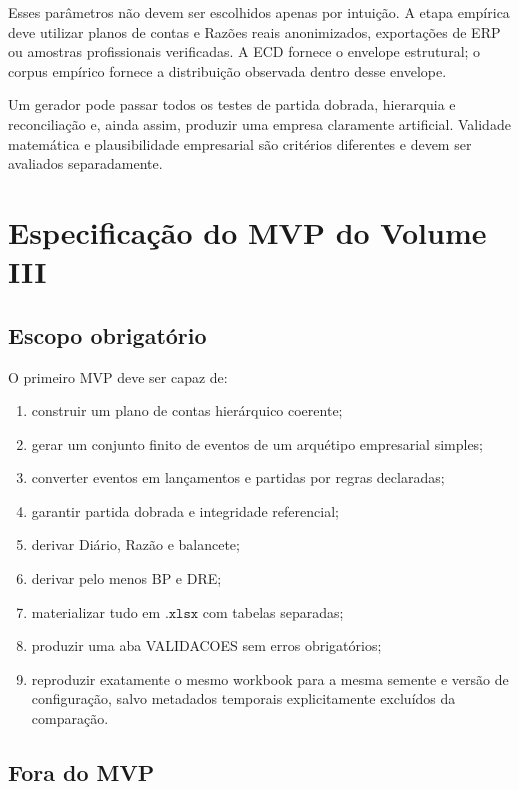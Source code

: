 \documentclass[11pt,a4paper]{article}
\begin{document}
Esses parâmetros não devem ser escolhidos apenas por intuição. A etapa empírica deve utilizar planos de contas e Razões reais anonimizados, exportações de ERP ou amostras profissionais verificadas. A ECD fornece o envelope estrutural; o corpus empírico fornece a distribuição observada dentro desse envelope.

\begin{cuidado}
Um gerador pode passar todos os testes de partida dobrada, hierarquia e reconciliação e, ainda assim, produzir uma empresa claramente artificial. Validade matemática e plausibilidade empresarial são critérios diferentes e devem ser avaliados separadamente.
\end{cuidado}

\section{Especificação do MVP do Volume III}

\subsection{Escopo obrigatório}

O primeiro MVP deve ser capaz de:
\begin{enumerate}
    \item construir um plano de contas hierárquico coerente;
    \item gerar um conjunto finito de eventos de um arquétipo empresarial simples;
    \item converter eventos em lançamentos e partidas por regras declaradas;
    \item garantir partida dobrada e integridade referencial;
    \item derivar Diário, Razão e balancete;
    \item derivar pelo menos BP e DRE;
    \item materializar tudo em $\texttt{.xlsx}$ com tabelas separadas;
    \item produzir uma aba VALIDACOES sem erros obrigatórios;
    \item reproduzir exatamente o mesmo workbook para a mesma semente e versão de configuração, salvo metadados temporais explicitamente excluídos da comparação.
\end{enumerate}

\subsection{Fora do MVP}
\end{document}
